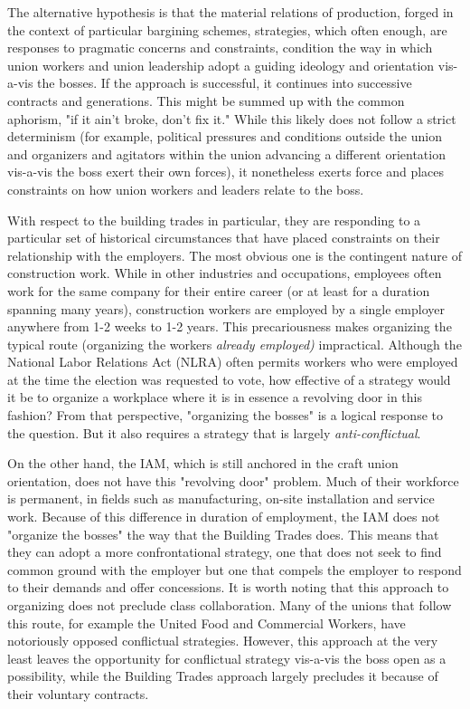 \documentclass[12pt]{article}
\begin{document}
The alternative hypothesis is that the material relations of production, forged in the context of particular bargining schemes, strategies, which often enough, are responses to pragmatic concerns and constraints, condition the way in which union workers and union leadership adopt a guiding ideology and orientation vis-a-vis the bosses. If the approach is successful, it continues into successive contracts and generations. This might be summed up with the common aphorism, "if it ain’t broke, don’t fix it." While this likely does not follow a strict determinism (for example, political pressures and conditions outside the union and organizers and agitators within the union advancing a different orientation vis-a-vis the boss exert their own forces), it nonetheless exerts force and places constraints on how union workers and leaders relate to the boss.

With respect to the building trades in particular, they are responding to a particular set of historical circumstances that have placed constraints on their relationship with the employers. The most obvious one is the contingent nature of construction work. While in other industries and occupations, employees often work for the same company for their entire career (or at least for a duration spanning many years), construction workers are employed by a single employer anywhere from 1-2 weeks to 1-2 years.  This precariousness makes organizing the typical route (organizing the workers \textit{already employed)} impractical. Although the National Labor Relations Act (NLRA) often permits workers who were employed at the time the election was requested to vote, how effective of a strategy would it be to organize a workplace where it is in essence a revolving door in this fashion? From that perspective, "organizing the bosses" is a logical response to the question. But it also requires a strategy that is largely \textit{anti-conflictual}.

On the other hand, the IAM, which is still anchored in the craft union orientation, does not have this "revolving door" problem. Much of their workforce is permanent, in fields such as manufacturing, on-site installation and service work.  Because of this difference in duration of employment, the IAM does not "organize the bosses" the way that the Building Trades does. This means that they can adopt a more confrontational strategy, one that does not seek to find common ground with the employer but one that compels the employer to respond to their demands and offer concessions. It is worth noting that this approach to organizing does not preclude class collaboration. Many of the unions that follow this route, for example the United Food and Commercial Workers, have notoriously opposed conflictual strategies. However, this approach at the very least leaves the opportunity for conflictual strategy vis-a-vis the boss open as a possibility, while the Building Trades approach largely precludes it because of their voluntary contracts. 
\end{document}
